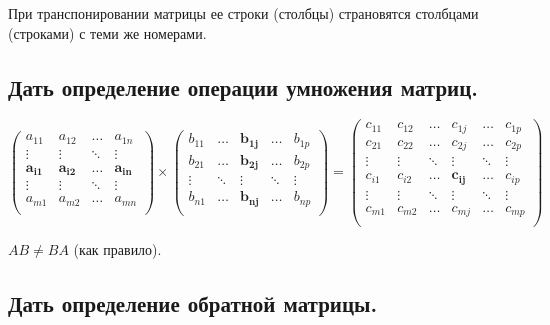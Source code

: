 При транспонировании матрицы ее строки (столбцы) страновятся столбцами (строками) с теми же номерами.

\subsection{Дать определение операции умножения матриц.}


$$
\begin{pmatrix} 
    a_{11}&a_{12}&\ldots&a_{1n}\\ 
    \vdots&\vdots&\ddots&\vdots\\
    \mathbf{a_{i1}}&\mathbf{a_{i2}}&\mathbf{\ldots}&\mathbf{a_{in}}\\ 
    \vdots&\vdots&\ddots&\vdots\\
    a_{m1}&a_{m2}&\ldots&a_{mn}\\ 
\end{pmatrix}
\times
\begin{pmatrix} 
    b_{11}&\ldots&\mathbf{b_{1j}}&\ldots&b_{1p}\\ 
    b_{21}&\ldots&\mathbf{b_{2j}}&\ldots&b_{2p}\\ 
    \vdots&\ddots&\mathbf{\vdots}&\ddots&\vdots\\
    b_{n1}&\ldots&\mathbf{b_{nj}}&\ldots&b_{np}\\ 
\end{pmatrix}
=
\begin{pmatrix} 
    c_{11}&c_{12}&\ldots&c_{1j}&\ldots&c_{1p}\\ 
    c_{21}&c_{22}&\ldots&c_{2j}&\ldots&c_{2p}\\ 
    \vdots&\vdots&\ddots&\vdots&\ddots&\vdots\\
    c_{i1}&c_{i2}&\ldots&\mathbf{c_{ij}}&\ldots&c_{ip}\\ 
    \vdots&\vdots&\ddots&\vdots&\ddots&\vdots\\
    c_{m1}&c_{m2}&\ldots&c_{mj}&\ldots&c_{mp}\\ 
\end{pmatrix}
$$

$AB \ne BA$ (как правило).

\subsection{Дать определение обратной матрицы.}

